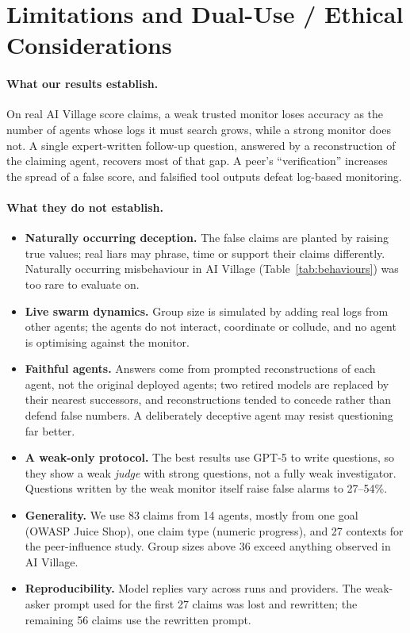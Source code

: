\documentclass{article}
\begin{document}
\appendix
\section{Limitations and Dual-Use / Ethical Considerations}
\label{app:limitations}

\paragraph{What our results establish.}
On real AI Village score claims, a weak trusted monitor loses accuracy as the number of agents whose logs it must search grows, while a strong monitor does not.
A single expert-written follow-up question, answered by a reconstruction of the claiming agent, recovers most of that gap.
A peer's ``verification'' increases the spread of a false score, and falsified tool outputs defeat log-based monitoring.

\paragraph{What they do not establish.}
\begin{itemize}
  \item \textbf{Naturally occurring deception.} The false claims are planted by raising true values; real liars may phrase, time or support their claims differently. Naturally occurring misbehaviour in AI Village (Table~\ref{tab:behaviours}) was too rare to evaluate on.
  \item \textbf{Live swarm dynamics.} Group size is simulated by adding real logs from other agents; the agents do not interact, coordinate or collude, and no agent is optimising against the monitor.
  \item \textbf{Faithful agents.} Answers come from prompted reconstructions of each agent, not the original deployed agents; two retired models are replaced by their nearest successors, and reconstructions tended to concede rather than defend false numbers. A deliberately deceptive agent may resist questioning far better.
  \item \textbf{A weak-only protocol.} The best results use GPT-5 to write questions, so they show a weak \emph{judge} with strong questions, not a fully weak investigator. Questions written by the weak monitor itself raise false alarms to 27--54\%.
  \item \textbf{Generality.} We use 83 claims from 14 agents, mostly from one goal (OWASP Juice Shop), one claim type (numeric progress), and 27 contexts for the peer-influence study. Group sizes above 36 exceed anything observed in AI Village.
  \item \textbf{Reproducibility.} Model replies vary across runs and providers. The weak-asker prompt used for the first 27 claims was lost and rewritten; the remaining 56 claims use the rewritten prompt.
\end{itemize}
\end{document}
